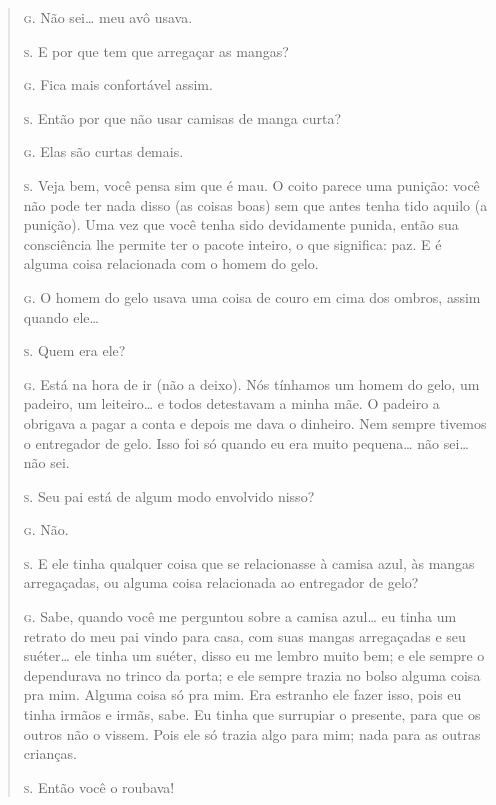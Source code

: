 \begin{quote}
\noindent\hskip0mm\textsc{g.} Não sei\ldots{} meu avô usava.

\noindent\hskip0mm\textsc{s.} E por que tem que arregaçar as mangas?

\noindent\hskip0mm\textsc{g.} Fica mais confortável assim.

\noindent\hskip0mm\textsc{s.} Então por que não usar camisas de manga curta?

\noindent\hskip0mm\textsc{g.} Elas são curtas demais.

\noindent\hskip0mm\textsc{s.} Veja bem, você pensa sim que é mau. O coito parece uma punição: você
não pode ter nada disso (as coisas boas) sem que antes tenha tido
aquilo (a punição). Uma vez que você tenha sido devidamente punida,
então sua consciência lhe permite ter o pacote inteiro, o que
significa: paz. E é alguma coisa relacionada com o homem do gelo.

\noindent\hskip0mm\textsc{g.} O homem do gelo usava uma coisa de couro em cima dos ombros, assim
quando ele\ldots{}

\noindent\hskip0mm\textsc{s.} Quem era ele?

\noindent\hskip0mm\textsc{g.} Está na hora de ir (não a deixo). Nós tínhamos um homem do gelo, um
padeiro, um leiteiro\ldots{} e todos detestavam a minha mãe. O padeiro a
obrigava a pagar a conta e depois me dava o dinheiro. Nem sempre
tivemos o entregador de gelo. Isso foi só quando eu era muito
pequena\ldots{} não sei\ldots{} não sei.

\noindent\hskip0mm\textsc{s.} Seu pai está de algum modo envolvido nisso?

\noindent\hskip0mm\textsc{g.} Não.

\noindent\hskip0mm\textsc{s.} E ele tinha qualquer coisa que se relacionasse à camisa azul, às
mangas arregaçadas, ou alguma coisa relacionada ao entregador de gelo?

\noindent\hskip0mm\textsc{g.} Sabe, quando você me perguntou sobre a camisa azul\ldots{} eu tinha um
retrato do meu pai vindo para casa, com suas mangas arregaçadas e seu
suéter\ldots{} ele tinha um suéter, disso eu me lembro muito bem; e ele
sempre o dependurava no trinco da porta; e ele sempre trazia no bolso
alguma coisa pra mim. Alguma coisa só pra mim. Era estranho ele fazer
isso, pois eu tinha irmãos e irmãs, sabe. Eu tinha que surrupiar o
presente, para que os outros não o vissem. Pois ele só trazia algo para
mim; nada para as outras crianças.

\noindent\hskip0mm\textsc{s.} Então você o roubava!


\end{quote}
